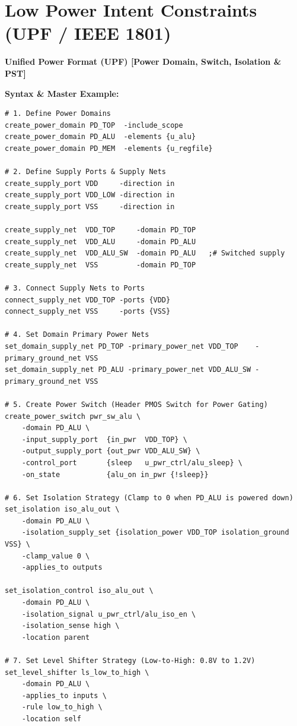 \documentclass[11pt,a4paper]{article}
\newenvironment{cmdbox}[2]{%
  \begin{mdframed}[style=cmdstyle]%
  {\bfseries\sffamily\color{primary}#1 \hfill \footnotesize\color{mutedgray}[#2]}\par\vspace{3pt}%
}{%
  \end{mdframed}%
}
\begin{document}
\section{Low Power Intent Constraints (UPF / IEEE 1801)}

\begin{cmdbox}{Unified Power Format (UPF)}{Power Domain, Switch, Isolation \& PST}
\textbf{Syntax \& Master Example:}
\begin{lstlisting}[style=upfstyle]
# 1. Define Power Domains
create_power_domain PD_TOP  -include_scope
create_power_domain PD_ALU  -elements {u_alu}
create_power_domain PD_MEM  -elements {u_regfile}

# 2. Define Supply Ports & Supply Nets
create_supply_port VDD     -direction in
create_supply_port VDD_LOW -direction in
create_supply_port VSS     -direction in

create_supply_net  VDD_TOP     -domain PD_TOP
create_supply_net  VDD_ALU     -domain PD_ALU
create_supply_net  VDD_ALU_SW  -domain PD_ALU   ;# Switched supply
create_supply_net  VSS         -domain PD_TOP

# 3. Connect Supply Nets to Ports
connect_supply_net VDD_TOP -ports {VDD}
connect_supply_net VSS     -ports {VSS}

# 4. Set Domain Primary Power Nets
set_domain_supply_net PD_TOP -primary_power_net VDD_TOP    -primary_ground_net VSS
set_domain_supply_net PD_ALU -primary_power_net VDD_ALU_SW -primary_ground_net VSS

# 5. Create Power Switch (Header PMOS Switch for Power Gating)
create_power_switch pwr_sw_alu \
    -domain PD_ALU \
    -input_supply_port  {in_pwr  VDD_TOP} \
    -output_supply_port {out_pwr VDD_ALU_SW} \
    -control_port       {sleep   u_pwr_ctrl/alu_sleep} \
    -on_state           {alu_on in_pwr {!sleep}}

# 6. Set Isolation Strategy (Clamp to 0 when PD_ALU is powered down)
set_isolation iso_alu_out \
    -domain PD_ALU \
    -isolation_supply_set {isolation_power VDD_TOP isolation_ground VSS} \
    -clamp_value 0 \
    -applies_to outputs

set_isolation_control iso_alu_out \
    -domain PD_ALU \
    -isolation_signal u_pwr_ctrl/alu_iso_en \
    -isolation_sense high \
    -location parent

# 7. Set Level Shifter Strategy (Low-to-High: 0.8V to 1.2V)
set_level_shifter ls_low_to_high \
    -domain PD_ALU \
    -applies_to inputs \
    -rule low_to_high \
    -location self


\end{lstlisting}
\end{cmdbox}
\end{document}
